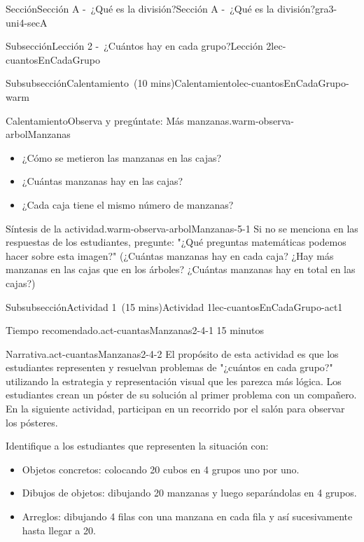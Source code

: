 \documentclass[oneside,10pt,]{article}
\begin{document}
\begin{sectionptx}{Sección}{Sección A -~¿Qué es la división?}{}{Sección A -~¿Qué es la división?}{}{}{gra3-uni4-secA}
\begin{subsectionptx}{Subsección}{Lección 2 -~¿Cuántos hay en cada grupo?}{}{Lección 2}{}{}{lec-cuantosEnCadaGrupo}
\begin{subsubsectionptx}{Subsubsección}{Calentamiento~(10 mins)}{}{Calentamiento}{}{}{lec-cuantosEnCadaGrupo-warm}
\begin{exploration}{Calentamiento}{Observa y pregúntate: Más manzanas.}{warm-observa-arbolManzanas}
\begin{itemize}[label=\textbullet]
\item{}¿Cómo se metieron las manzanas en las cajas?%
\item{}¿Cuántas manzanas hay en las cajas?%
\item{}¿Cada caja tiene el mismo número de manzanas?%
\end{itemize}
%
\end{exploration}%
%
\par
\begin{paragraphs}{Síntesis de la actividad.}{warm-observa-arbolManzanas-5-1}%
Si no se menciona en las respuestas de los estudiantes, pregunte: "¿Qué preguntas matemáticas podemos hacer sobre esta imagen?" (¿Cuántas manzanas hay en cada caja? ¿Hay más manzanas en las cajas que en los árboles? ¿Cuántas manzanas hay en total en las cajas?)%
\end{paragraphs}%
\end{subsubsectionptx}
%
%
\typeout{************************************************}
\typeout{************************************************}
%
\begin{subsubsectionptx}{Subsubsección}{Actividad 1~(15 mins)}{}{Actividad 1}{}{}{lec-cuantosEnCadaGrupo-act1}
\par
\begin{paragraphs}{Tiempo recomendado.}{act-cuantasManzanas2-4-1}%
15 minutos%
\end{paragraphs}%
\begin{paragraphs}{Narrativa.}{act-cuantasManzanas2-4-2}%
El propósito de esta actividad es que los estudiantes representen y resuelvan problemas de "¿cuántos en cada grupo?" utilizando la estrategia y representación visual que les parezca más lógica. Los estudiantes crean un póster de su solución al primer problema con un compañero. En la siguiente actividad, participan en un recorrido por el salón para observar los pósteres.%
\par
Identifique a los estudiantes que representen la situación con:%
%
\begin{itemize}[label=\textbullet]
\item{}Objetos concretos: colocando 20 cubos en 4 grupos uno por uno.%
\item{}Dibujos de objetos: dibujando 20 manzanas y luego separándolas en 4 grupos.%
\item{}Arreglos: dibujando 4 filas con una manzana en cada fila y así sucesivamente hasta llegar a 20.%

\end{itemize}
\end{paragraphs}
\end{subsubsectionptx}
\end{subsectionptx}
\end{sectionptx}
\end{document}
